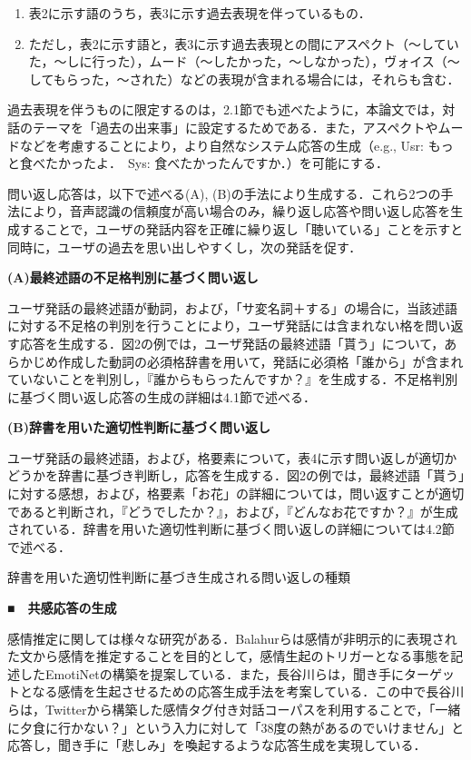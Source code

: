 \documentclass[japanese]{jnlp_1.4}
\begin{document}
  \begin{enumerate}
   \item 表2に示す語のうち，表3に示す過去表現を伴っているもの．
   \item ただし，表2に示す語と，表3に示す過去表現との間にアスペクト（〜していた，〜しに行った），ムード（〜したかった，〜しなかった），ヴォイス（〜してもらった，〜された）などの表現が含まれる場合には，それらも含む．
   \end{enumerate}

過去表現を伴うものに限定するのは，2.1節でも述べたように，本論文では，対話のテーマを「過去の出来事」に設定するためである．また，アスペクトやムードなどを考慮することにより，より自然なシステム応答の生成（e.g., Usr: もっと食べたかったよ．　Sys: 食べたかったんですか．）を可能にする．

問い返し応答は，以下で述べる(A), (B)の手法により生成する．これら2つの手法により，音声認識の信頼度が高い場合のみ，繰り返し応答や問い返し応答を生成することで，ユーザの発話内容を正確に繰り返し「聴いている」ことを示すと同時に，ユーザの過去を思い出しやすくし，次の発話を促す．


\noindent\textbf{(A)最終述語の不足格判別に基づく問い返し}

ユーザ発話の最終述語が動詞，および，「サ変名詞＋する」の場合に，当該述語に対する不足格の判別を行うことにより，ユーザ発話には含まれない格を問い返す応答を生成する．図2の例では，ユーザ発話の最終述語「貰う」について，あらかじめ作成した動詞の必須格辞書を用いて，発話に必須格「誰から」が含まれていないことを判別し，『誰からもらったんですか？』を生成する．不足格判別に基づく問い返し応答の生成の詳細は4.1節で述べる． 


\noindent\textbf{(B)辞書を用いた適切性判断に基づく問い返し}

ユーザ発話の最終述語，および，格要素について，表4に示す問い返しが適切かどうかを辞書に基づき判断し，応答を生成する．図2の例では，最終述語「貰う」に対する感想，および，格要素「お花」の詳細については，問い返すことが適切であると判断され，『どうでしたか？』，および，『どんなお花ですか？』が生成されている．辞書を用いた適切性判断に基づく問い返しの詳細については4.2節で述べる．

\begin{table}[b]
\caption{辞書を用いた適切性判断に基づき生成される問い返しの種類}
\label{table:4}

\end{table}

\noindent\textbf{■　共感応答の生成}

感情推定に関しては様々な研究がある\cite{no33}．Balahurらは感情が非明示的に表現された文から感情を推定することを目的として，感情生起のトリガーとなる事態を記述したEmotiNetの構築を提案している\cite{no31}．また，長谷川らは，聞き手にターゲットとなる感情を生起させるための応答生成手法を考案している\cite{no35}．この中で長谷川らは，Twitterから構築した感情タグ付き対話コーパスを利用することで，「一緒に夕食に行かない？」という入力に対して「38度の熱があるのでいけません」と応答し，聞き手に「悲しみ」を喚起するような応答生成を実現している．
\end{document}
